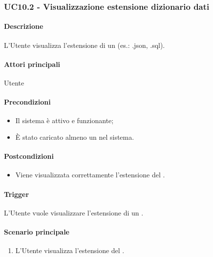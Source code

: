 \subsubsection{UC10.2 - Visualizzazione estensione dizionario dati}\label{UC10point2}
\paragraph*{Descrizione}
L'Utente visualizza l'estensione di un  (es.: .json, .sql).

\paragraph*{Attori principali}
Utente

\paragraph*{Precondizioni}
\begin{itemize}
  \item Il sistema è attivo e funzionante;
  \item È stato caricato almeno un  nel sistema. 
\end{itemize}

\paragraph*{Postcondizioni}
\begin{itemize}
  \item Viene visualizzata correttamente l'estensione del .
\end{itemize}

\paragraph*{Trigger}
L'Utente vuole visualizzare l'estensione di un .

\paragraph*{Scenario principale}
\begin{enumerate}
  \item L'Utente visualizza l'estensione del .
\end{enumerate}


